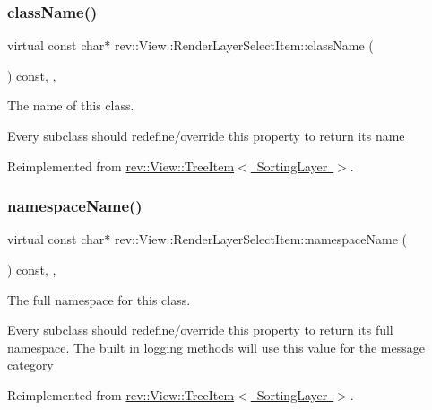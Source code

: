 \subsubsection{\texorpdfstring{className()}{className()}}
{\footnotesize\ttfamily virtual const char$\ast$ rev\+::\+View\+::\+Render\+Layer\+Select\+Item\+::class\+Name (\begin{DoxyParamCaption}{ }\end{DoxyParamCaption}) const\hspace{0.3cm}{\ttfamily [inline]}, {\ttfamily [override]}, {\ttfamily [virtual]}}



The name of this class. 

Every subclass should redefine/override this property to return its name 

Reimplemented from \mbox{\hyperlink{classrev_1_1_view_1_1_tree_item_a8a12a6ceece6cab7a2299da2b5e6a54b}{rev\+::\+View\+::\+Tree\+Item$<$ Sorting\+Layer $>$}}.

\mbox{\label{classrev_1_1_view_1_1_render_layer_select_item_a2d8ca1314c2b66567c2e9de8bd717f4f}} 
\subsubsection{\texorpdfstring{namespaceName()}{namespaceName()}}
{\footnotesize\ttfamily virtual const char$\ast$ rev\+::\+View\+::\+Render\+Layer\+Select\+Item\+::namespace\+Name (\begin{DoxyParamCaption}{ }\end{DoxyParamCaption}) const\hspace{0.3cm}{\ttfamily [inline]}, {\ttfamily [override]}, {\ttfamily [virtual]}}



The full namespace for this class. 

Every subclass should redefine/override this property to return its full namespace. The built in logging methods will use this value for the message category 

Reimplemented from \mbox{\hyperlink{classrev_1_1_view_1_1_tree_item_a3bb552a87176f4b12848e43dfdd287b2}{rev\+::\+View\+::\+Tree\+Item$<$ Sorting\+Layer $>$}}.

